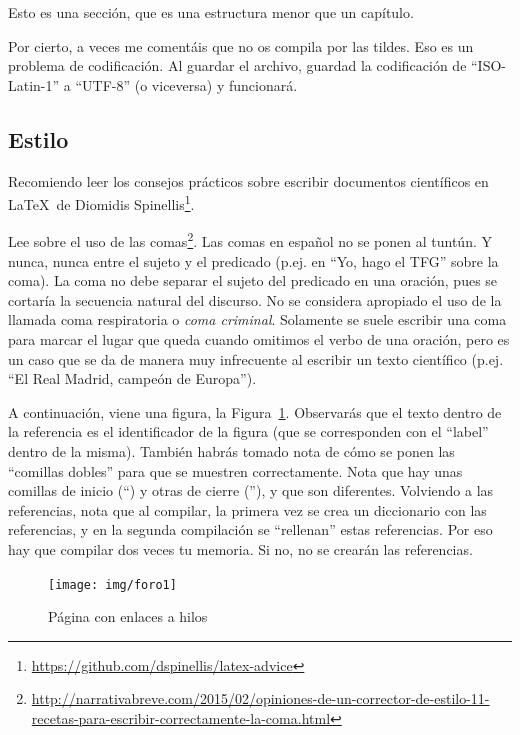 \documentclass[a4paper, 12pt]{book}
\begin{document}
Esto es una sección, que es una estructura menor que un capítulo. 

Por cierto, a veces me comentáis que no os compila por las tildes.
Eso es un problema de codificación.
Al guardar el archivo, guardad la codificación de ``ISO-Latin-1'' a ``UTF-8'' (o viceversa) y funcionará.

\subsection{Estilo}
\label{subsec:estilo}

Recomiendo leer los consejos prácticos sobre escribir documentos científicos en \LaTeX \ de Diomidis Spinellis\footnote{\url{https://github.com/dspinellis/latex-advice}}.

Lee sobre el uso de las comas\footnote{\url{http://narrativabreve.com/2015/02/opiniones-de-un-corrector-de-estilo-11-recetas-para-escribir-correctamente-la-coma.html}}. 
Las comas en español no se ponen al tuntún.
Y nunca, nunca entre el sujeto y el predicado (p.ej. en ``Yo, hago el TFG'' sobre la coma).
La coma no debe separar el sujeto del predicado en una oración, pues se cortaría la secuencia natural del discurso.
No se considera apropiado el uso de la llamada coma respiratoria o \emph{coma criminal}.
Solamente se suele escribir una coma para marcar el lugar que queda cuando omitimos el verbo de una oración, pero es un caso que se da de manera muy infrecuente al escribir un texto científico (p.ej. ``El Real Madrid, campeón de Europa'').

A continuación, viene una figura, la Figura~\ref{figura:foro_hilos}. 
Observarás que el texto dentro de la referencia es el identificador de la figura (que se corresponden con el ``label'' dentro de la misma). 
También habrás tomado nota de cómo se ponen las ``comillas dobles'' para que se muestren correctamente. 
Nota que hay unas comillas de inicio (``) y otras de cierre (''), y que son diferentes.
Volviendo a las referencias, nota que al compilar, la primera vez se crea un diccionario con las referencias, y en la segunda compilación se ``rellenan'' estas referencias. 
Por eso hay que compilar dos veces tu memoria.
Si no, no se crearán las referencias.



 \begin{figure}
    \centering
    \texttt{[image: img/foro1]}
    \caption{Página con enlaces a hilos}
    \label{figura:foro_hilos}
 \end{figure}
\end{document}
